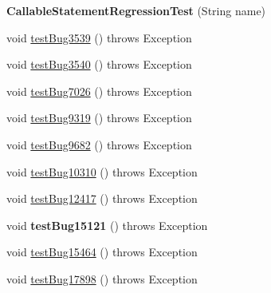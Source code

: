 \begin{DoxyCompactItemize}
\item 
\mbox{\label{classtestsuite_1_1regression_1_1_callable_statement_regression_test_af9ef106e44b57c0840c422e64fb25fe7}} 
{\bfseries Callable\+Statement\+Regression\+Test} (String name)
\item 
void \mbox{\hyperlink{classtestsuite_1_1regression_1_1_callable_statement_regression_test_a6c39c2788d35a24b2933541c30b8738d}{test\+Bug3539}} ()  throws Exception 
\item 
void \mbox{\hyperlink{classtestsuite_1_1regression_1_1_callable_statement_regression_test_a060bce79977b8f767964814bd7f23f80}{test\+Bug3540}} ()  throws Exception 
\item 
void \mbox{\hyperlink{classtestsuite_1_1regression_1_1_callable_statement_regression_test_a7bf5345327e03c1c948299a62ca552c7}{test\+Bug7026}} ()  throws Exception 
\item 
void \mbox{\hyperlink{classtestsuite_1_1regression_1_1_callable_statement_regression_test_aeeca9a21c07d1325e181cbd40bef0199}{test\+Bug9319}} ()  throws Exception 
\item 
void \mbox{\hyperlink{classtestsuite_1_1regression_1_1_callable_statement_regression_test_aa84b6f7f456f3d576c6d8c22213a24b2}{test\+Bug9682}} ()  throws Exception 
\item 
void \mbox{\hyperlink{classtestsuite_1_1regression_1_1_callable_statement_regression_test_a8cd92a05056f0d180cf2d2f9f68bea36}{test\+Bug10310}} ()  throws Exception 
\item 
void \mbox{\hyperlink{classtestsuite_1_1regression_1_1_callable_statement_regression_test_a94871dee0acb2b3df8de40559b08d32d}{test\+Bug12417}} ()  throws Exception 
\item 
\mbox{\label{classtestsuite_1_1regression_1_1_callable_statement_regression_test_a8378792de361d7a282b26a61c3b2f8a9}} 
void {\bfseries test\+Bug15121} ()  throws Exception 
\item 
void \mbox{\hyperlink{classtestsuite_1_1regression_1_1_callable_statement_regression_test_a5448d02b9a24375eb4b2d175d273c20f}{test\+Bug15464}} ()  throws Exception 
\item 
void \mbox{\hyperlink{classtestsuite_1_1regression_1_1_callable_statement_regression_test_a32278d6baf7013d850879cfd634b38cc}{test\+Bug17898}} ()  throws Exception 

\end{DoxyCompactItemize}
